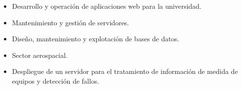 \documentclass[10pt,a4paper,ragged2e]{altacv}
\begin{document}
\begin{itemize}
\item Desarrollo y operación de aplicaciones web para la universidad.   
\item Mantenimiento y gestión de servidores. 
\item Diseño, mantenimiento y explotación de bases de datos.
\end{itemize}
\divider

\begin{itemize}
\item Sector aerospacial.
\item Despliegue de un servidor para el tratamiento de información de medida de equipos y detección de fallos.  
\end{itemize}
\divider


\clearpage
\end{document}
